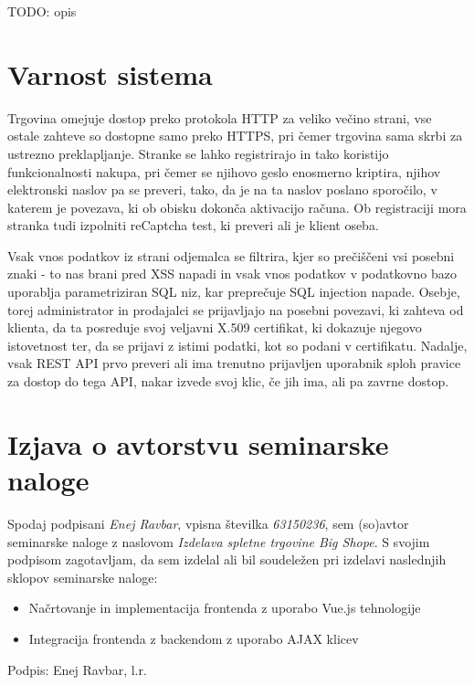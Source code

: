 \documentclass[a4paper,12pt]{report}
\newcommand{\naslov}     {Izdelava spletne trgovine Big Shope}
\newcommand{\prviavtor}  {Enej Ravbar}
\newcommand{\prviindeks} {63150236}
\begin{document}
TODO: opis

\chapter{Varnost sistema}

Trgovina omejuje dostop preko protokola HTTP za veliko večino strani, vse ostale zahteve so dostopne samo preko HTTPS, pri čemer trgovina sama skrbi za ustrezno preklapljanje. Stranke se lahko registrirajo in tako koristijo funkcionalnosti nakupa, pri čemer se njihovo geslo enosmerno kriptira, njihov elektronski naslov pa se preveri, tako, da je na ta naslov poslano sporočilo, v katerem je povezava, ki ob obisku dokonča aktivacijo računa. Ob registraciji mora stranka tudi izpolniti reCaptcha test, ki preveri ali je klient oseba.

Vsak vnos podatkov iz strani odjemalca se filtrira, kjer so prečiščeni vsi posebni znaki - to nas brani pred XSS napadi in vsak vnos podatkov v podatkovno bazo uporablja parametriziran SQL niz, kar preprečuje SQL injection napade. Osebje, torej administrator in prodajalci se prijavljajo na posebni povezavi, ki zahteva od klienta, da ta posreduje svoj veljavni X.509 certifikat, ki dokazuje njegovo istovetnost ter, da se prijavi z istimi podatki, kot so podani v certifikatu. Nadalje, vsak REST API prvo preveri ali ima trenutno prijavljen uporabnik sploh pravice za dostop do tega API, nakar izvede svoj klic, če jih ima, ali pa zavrne dostop.

\chapter{Izjava o avtorstvu seminarske naloge}

Spodaj podpisani \textit{\prviavtor}, vpisna številka \textit{\prviindeks}, sem (so)avtor seminarske naloge z naslovom \textit{\naslov}. S svojim podpisom zagotavljam, da sem izdelal ali bil soudeležen pri izdelavi naslednjih sklopov seminarske naloge:
\begin{itemize}
    \item Načrtovanje in implementacija frontenda z uporabo Vue.js tehnologije
    \item Integracija frontenda z backendom z uporabo AJAX klicev
\end{itemize}

Podpis: {\prviavtor}, l.r.

\newpage
\end{document}

